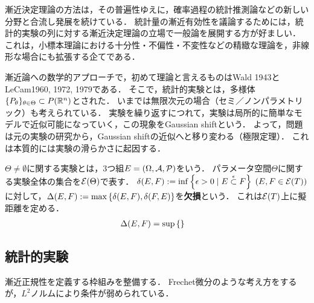 \documentclass[uplatex,dvipdfmx]{jsreport}
\begin{document}
\begin{tcolorbox}[colframe=ForestGreen, colback=ForestGreen!10!white,breakable,colbacktitle=ForestGreen!40!white,coltitle=black,fonttitle=\bfseries\sffamily,
title=]
    漸近決定理論の方法は，その普遍性ゆえに，確率過程の統計推測論などの新しい分野と合流し発展を続けている．
    統計量の漸近有効性を議論するためには，統計的実験の列に対する漸近決定理論の立場で一般論を展開する方が好ましい．
    これは，小標本理論における十分性・不偏性・不変性などの精緻な理論を，非線形な場合にも拡張する企てである．
\end{tcolorbox}

\begin{history}
    漸近論への数学的アプローチで，初めて理論と言えるものはWald 1943とLeCam1960, 1972, 1979である．
    そこで，統計的実験とは，多様体$\{P_\theta\}_{\theta\in\Theta}\subset P(\mathbb{R}^n)$とされた．
    いまでは無限次元の場合（セミ／ノンパラメトリック）も考えられている．
    実験を繰り返すにつれて，実験は局所的に簡単なモデルで近似可能になっていく，この現象をGaussian shiftという．
    よって，問題は元の実験の研究から，Gaussian shiftの近似へと移り変わる（極限定理）．
    これは本質的には実験の滑らかさに起因する．
\end{history}

\begin{definition}
    $\Theta\ne\emptyset$に関する実験とは，3つ組$E=(\Omega,\mathcal{A},\mathcal{P})$をいう．
    パラメータ空間$\Theta$に関する実験全体の集合を$\mathcal{E}(\Theta)$で表す．
    $\delta(E,F):=\inf\left\{\epsilon>0\mid E\overset{\epsilon}{\subset} F\right\}\;(E,F\in\mathcal{E}(T))$に対して，$\Delta(E,F):=\max\left\{\delta(E,F),\delta(F,E)\right\}$を\textbf{欠損}という．
    これは$\mathcal{E}(T)$上に擬距離を定める．
    \begin{align*}
        \Delta(E,F)&=\sup\left\{\right\}
    \end{align*}
\end{definition}

\subsection{統計的実験}

\begin{tcolorbox}[colframe=ForestGreen, colback=ForestGreen!10!white,breakable,colbacktitle=ForestGreen!40!white,coltitle=black,fonttitle=\bfseries\sffamily,
title=]
    漸近正規性を定義する枠組みを整備する．
    Frechet微分のような考え方をするが，$L^2$ノルムにより条件が弱められている\cite{Ibragimov HasMinskii}．
\end{tcolorbox}
\end{document}
